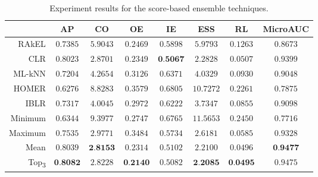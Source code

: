 \begin{table*}[ht]
	\begin{center}
	\label{tab:score-table}
		\begin{tabular}{rccccccc}
		\toprule
			 & AP & CO & OE & IE & ESS & RL & MicroAUC\\
			\midrule
			RAkEL & $0.7385$ & $5.9043$ & $0.2469$ & $0.5898$ & $5.9793$ & $0.1263$ & $0.8673$\\
			CLR & $0.8023$ & $2.8701$ & $0.2349$ & $\textbf{0.5067}$ & $2.2828$ & $0.0507$ & $0.9399$\\
			ML-kNN & $0.7204$ & $4.2654$ & $0.3126$ & $0.6371$ & $4.0329$ & $0.0930$ & $0.9048$\\
			HOMER & $0.6276$ & $8.8283$ & $0.3579$ & $0.6805$ & $10.7272$ & $0.2261$ & $0.7875$\\
			IBLR & $0.7317$ & $4.0045$ & $0.2972$ & $0.6222$ & $3.7347$ & $0.0855$ & $0.9098$\\
			Minimum & $0.6344$ & $9.3977$ & $0.2747$ & $0.6765$ & $11.5653$ & $0.2450$ & $0.7716$\\
			Maximum & $0.7535$ & $2.9771$ & $0.3484$ & $0.5734$ & $2.6181$ & $0.0585$ & $0.9328$\\
			Mean & $0.8039$ & $\textbf{2.8153}$ & $0.2314$ & $0.5102$ & $2.2100$ & $0.0496$ & $\textbf{0.9477}$\\
			Top\textsubscript{3} & $\textbf{0.8082}$ & $2.8228$ & $\textbf{0.2140}$ & $0.5082$ & $\textbf{2.2085}$ & $\textbf{0.0495}$ & $0.9475$\\
		\bottomrule
		\end{tabular}
                \caption{Experiment results for the score-based ensemble techniques.}
	\end{center}
\end{table*}
